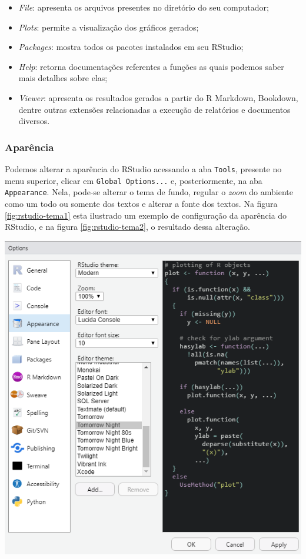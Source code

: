 \documentclass[
  brazilian,
]{book}
\let\origfigure\figure
\let\endorigfigure\endfigure
\renewenvironment{figure}[1][2] {
    \expandafter\origfigure\expandafter[H]
} {
    \endorigfigure
}
\begin{document}
\begin{itemize}
\item
  \emph{File}: apresenta os arquivos presentes no diretório do seu computador;
\item
  \emph{Plots}: permite a visualização dos gráficos gerados;
\item
  \emph{Packages}: mostra todos os pacotes instalados em seu RStudio;
\item
  \emph{Help}: retorna documentações referentes a funções as quais podemos saber mais detalhes sobre elas;
\item
  \emph{Viewer}: apresenta os resultados gerados a partir do R Markdown, Bookdown, dentre outras extensões relacionadas a execução de relatórios e documentos diversos.
\end{itemize}

\hypertarget{aparuxeancia}{%
\subsubsection*{Aparência}\label{aparuxeancia}}

Podemos alterar a aparência do RStudio acessando a aba \texttt{Tools}, presente no menu superior, clicar em \texttt{Global\ Options...} e, posteriormente, na aba \texttt{Appearance}. Nela, pode-se alterar o tema de fundo, regular o \emph{zoom} do ambiente como um todo ou somente dos textos e alterar a fonte dos textos. Na figura \ref{fig:rstudio-tema1} esta ilustrado um exemplo de configuração da aparência do RStudio, e na figura \ref{fig:rstudio-tema2}, o resultado dessa alteração.

\begin{figure}

{\centering \includegraphics[width=0.6\linewidth]{imagens/rstudio_tema1} 

}

\caption{Podemos configurar a aparência do RStudio em diversos aspectos. Faça alguns testes e veja qual lhe agrada mais.}\label{fig:rstudio-tema1}
\end{figure}
\end{document}

